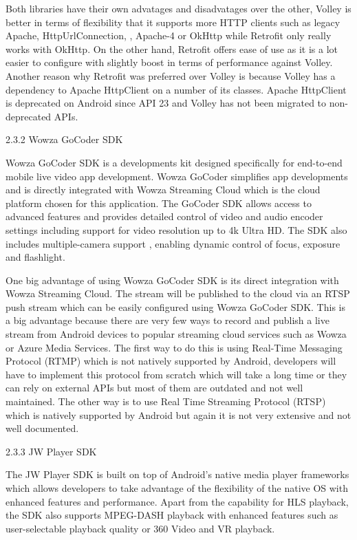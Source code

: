 \documentclass{article}
\begin{document}
\begin{flushleft}
Both libraries have their own advatages and disadvatages over the other, Volley is better in terms of flexibility that it supports more HTTP clients such as legacy Apache, HttpUrlConnection, , Apache-4 or OkHttp while Retrofit only really works with OkHttp. On the other hand, Retrofit offers ease of use as it is a lot easier to configure with slightly boost in terms of performance against Volley. Another reason why Retrofit was preferred over Volley is because Volley has a dependency  to Apache HttpClient on a number of its classes. Apache HttpClient is deprecated on Android since API 23 and Volley has not been migrated to non-deprecated APIs.\par
{\large 2.3.2 Wowza GoCoder SDK}\par
Wowza GoCoder SDK is a developments kit designed specifically for end-to-end mobile live video app development. Wowza GoCoder simplifies app developments and is directly integrated with Wowza Streaming Cloud which is the cloud platform chosen for this application. The GoCoder SDK allows access to advanced features and provides detailed control of video and audio encoder settings including support for video resolution up to 4k Ultra HD. The SDK also includes multiple-camera support , enabling dynamic control of focus, exposure and flashlight.\par
One big advantage of using Wowza GoCoder SDK is its direct integration with Wowza Streaming Cloud. The stream will be published to the cloud via an RTSP push stream which can be easily configured using Wowza GoCoder SDK. This is a big advantage because there are very few ways to record and publish a live stream from Android devices to popular streaming cloud services such as Wowza or Azure Media Services. The first way to do this is using Real-Time Messaging Protocol (RTMP) which is not natively supported by Android, developers will have to implement this protocol from scratch which will take a long time or they can rely on external APIs but most of them are outdated and not well maintained. The other way is to use Real Time Streaming Protocol (RTSP) which is natively supported by Android but again it is not very extensive and not well documented.\par
{\large 2.3.3 JW Player SDK}\par
The JW Player SDK is built on top of Android's native media player frameworks which allows developers to take advantage of the flexibility of the native OS with enhanced features and performance. Apart from the capability for HLS playback, the SDK also supports MPEG-DASH playback with enhanced features such as user-selectable playback quality or 360 Video and VR playback.\par

\end{flushleft}
\end{document}
